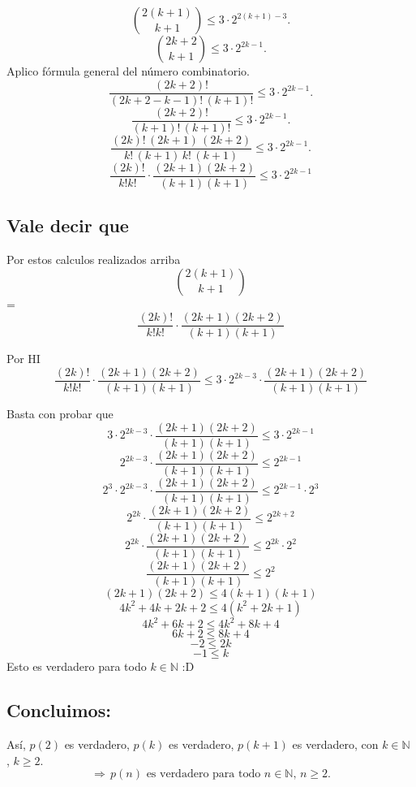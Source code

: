\documentclass{article}
\begin{document}
\[
\binom{2(k+1)}{k+1} \leq 3 \cdot 2^{2(k+1) - 3}.
\]  \[
\binom{2k+2}{k+1} \leq 3 \cdot 2^{2k-1}.
\] 
Aplico fórmula general del número combinatorio.
\[
\frac{(2k+2)!}{(2k+2-k-1)! \, (k+1)!} \leq 3 \cdot 2^{2k-1}.
\]
\[
\frac{(2k+2)!}{(k+1)! \, (k+1)!} \leq 3 \cdot 2^{2k-1}.
\]
\[
\frac{(2k)! \, (2k+1) \, (2k+2)}{k! \, (k+1) \, k! \, (k+1)} \leq 3 \cdot 2^{2k-1}.
\]
\[
\frac{(2k)!}{k!k!} \cdot \frac{(2k+1)(2k+2)}{(k+1)(k+1)} \leq 3 \cdot 2^{2k-1}
\]

\subsection*{Vale decir que}
Por estos calculos realizados arriba
\[
\binom{2(k+1)}{k+1}
\] = \[
\frac{(2k)!}{k!k!} \cdot \frac{(2k+1)(2k+2)}{(k+1)(k+1)}
\]

Por HI 
\[
\frac{(2k)!}{k!k!} \cdot \frac{(2k+1)(2k+2)}{(k+1)(k+1)} \leq 3 \cdot 2^{2k-3}\cdot \frac{(2k+1)(2k+2)}{(k+1)(k+1)}
\] 

Basta con probar que 
\[
3 \cdot 2^{2k-3}\cdot \frac{(2k+1)(2k+2)}{(k+1)(k+1)} \leq 3 \cdot 2^{2k-1}
\] 
\[
2^{2k-3}\cdot \frac{(2k+1)(2k+2)}{(k+1)(k+1)} \leq 2^{2k-1}
\]
\[
2^3\cdot 2^{2k-3}\cdot \frac{(2k+1)(2k+2)}{(k+1)(k+1)} \leq 2^{2k-1}\cdot2^3
\]
\[
2^{2k}\cdot \frac{(2k+1)(2k+2)}{(k+1)(k+1)} \leq 2^{2k+2}
\]
\[
2^{2k}\cdot \frac{(2k+1)(2k+2)}{(k+1)(k+1)} \leq 2^{2k}\cdot2^{2}
\]
\[
\frac{(2k+1)(2k+2)}{(k+1)(k+1)} \leq 2^{2}
\]
\[
(2k+1)(2k+2) \leq 4(k+1)(k+1)
\]
\[
4k^2 + 4k + 2k +2 \leq 4(k^2 +2k + 1)
\]
\[
4k^2 + 6k  +2 \leq 4k^2 +8k + 4
\]
\[
 6k  +2 \leq 8k + 4
\]
\[
-2 \leq 2k
\]
\[
-1 \leq k
\]
Esto es verdadero para todo \( k \in \mathbb{N}\) :D

\subsection*{Concluimos:}

Así, \( p(2) \) es verdadero, \( p(k) \) es verdadero, \( p(k+1) \) es verdadero, con \( k \in \mathbb{N} \) , \( k \geq 2 \). 
\[
\Rightarrow \, p(n) \text{ es verdadero para todo } n \in \mathbb{N}, \, n \geq 2.
\]
\end{document}
